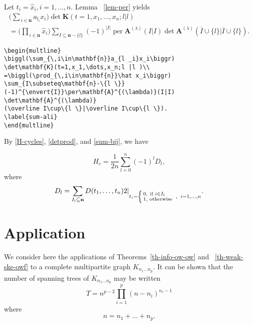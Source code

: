 \documentclass[mlq,fleqn]{w-art}
\DeclareMathOperator{\per}{per}
\newcommand{\eval}[2][\right]{\relax
  \ifx#1\right\relax \left.\fi#2#1\rvert}
\newcommand{\envert}[1]{\left\lvert#1\right\rvert}
\begin{document}
Let $t_i=\hat x_i,i=1,\dots,n$. Lemma ~\ref{lem-per} yields
\begin{multline}
\biggl(\sum_{\,i\in\mathbf{n}}a_{l _i}x_i\biggr)
\det\mathbf{K}(t=1,x_1,\dots,x_n;l |l )\\
=\biggl(\prod_{\,i\in\mathbf{n}}\hat x_i\biggr)
\sum_{I\subseteq\mathbf{n}-\{l \}}
(-1)^{\envert{I}}\per\mathbf{A}^{(\lambda)}(I|I)
\det\mathbf{A}^{(\lambda)}
(\overline I\cup\{l \}|\overline I\cup\{l \}).
\label{sum-ali}
\end{multline}
\begin{verbatim}
\begin{multline}
\biggl(\sum_{\,i\in\mathbf{n}}a_{l _i}x_i\biggr)
\det\mathbf{K}(t=1,x_1,\dots,x_n;l |l )\\
=\biggl(\prod_{\,i\in\mathbf{n}}\hat x_i\biggr)
\sum_{I\subseteq\mathbf{n}-\{l \}}
(-1)^{\envert{I}}\per\mathbf{A}^{(\lambda)}(I|I)
\det\mathbf{A}^{(\lambda)}
(\overline I\cup\{l \}|\overline I\cup\{l \}).
\label{sum-ali}
\end{multline}
\end{verbatim}

By \eqref{H-cycles}, \eqref{detprod}, and \eqref{sum-bij}, we have
\begin{prop}\label{prop:eg}
\begin{equation}
H_c=\frac1{2n}\sum^n_{l =0}(-1)^{l}
D_{l},
\end{equation}
where
\begin{equation}\label{delta-l}
D_{l}=\eval[2]{\sum_{I_{l}\subseteq \mathbf{n}}
D(t_1,\dots,t_n)}_{t_i=\left\{\begin{smallmatrix}
0,& \text{if }i\in I_{l}\quad\\%
1,& \text{otherwise}\end{smallmatrix}\right.\;,\;\; i=1,\dots,n}.
\end{equation}
\end{prop}

\section{Application}
\label{lincomp}

We consider here the applications of Theorems~\ref{th-info-ow-ow} and
~\ref{th-weak-ske-owf} to a complete
multipartite graph $K_{n_1\dots n_p}$. It can be shown that the
number of spanning trees of $K_{n_1\dots n_p}$
may be written
\begin{equation}\label{e:st}
T=n^{p-2}\prod^p_{i=1}
(n-n_i)^{n_i-1}
\end{equation}
where
\begin{equation}
n=n_1+\dots+n_p.
\end{equation}
\end{document}
